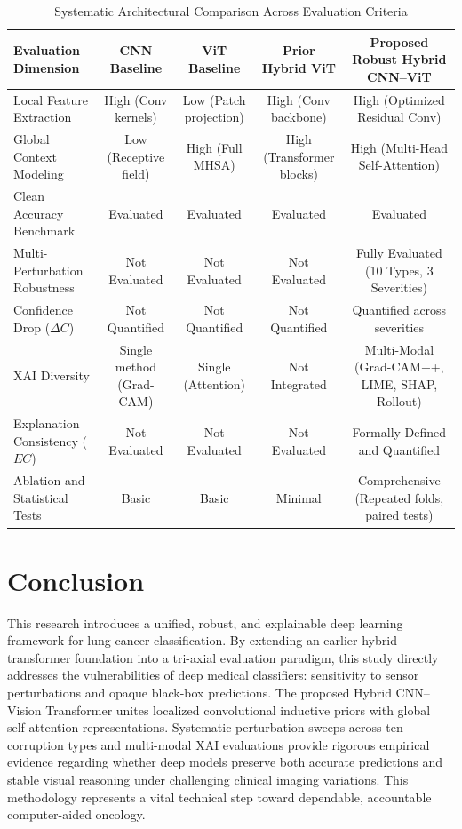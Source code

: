 \documentclass[conference]{IEEEtran}
\begin{document}
\begin{table}[t]
\caption{Systematic Architectural Comparison Across Evaluation Criteria}
\label{tab:final_comparison}
\centering
\begin{tabular}{lcccc}
\toprule
\textbf{Evaluation Dimension} & \textbf{CNN Baseline} & \textbf{ViT Baseline} & \textbf{Prior Hybrid ViT \cite{ORIGINAL_PROJECT_REF}} & \textbf{Proposed Robust Hybrid CNN--ViT} \\
\midrule
Local Feature Extraction       & High (Conv kernels)     & Low (Patch projection) & High (Conv backbone)       & High (Optimized Residual Conv) \\
Global Context Modeling        & Low (Receptive field)   & High (Full MHSA)       & High (Transformer blocks)  & High (Multi-Head Self-Attention) \\
Clean Accuracy Benchmark       & Evaluated               & Evaluated              & Evaluated                  & Evaluated \\
Multi-Perturbation Robustness  & Not Evaluated           & Not Evaluated          & Not Evaluated              & Fully Evaluated (10 Types, 3 Severities) \\
Confidence Drop ($\Delta C$)   & Not Quantified          & Not Quantified         & Not Quantified             & Quantified across severities \\
XAI Diversity                  & Single method (Grad-CAM)& Single (Attention)     & Not Integrated             & Multi-Modal (Grad-CAM++, LIME, SHAP, Rollout) \\
Explanation Consistency ($EC$) & Not Evaluated           & Not Evaluated          & Not Evaluated              & Formally Defined and Quantified \\
Ablation and Statistical Tests & Basic                   & Basic                  & Minimal                    & Comprehensive (Repeated folds, paired tests) \\
\bottomrule
\end{tabular}
\end{table}

\section{Conclusion}
\label{sec:conclusion}

This research introduces a unified, robust, and explainable deep learning framework for lung cancer classification. By extending an earlier hybrid transformer foundation into a tri-axial evaluation paradigm, this study directly addresses the vulnerabilities of deep medical classifiers: sensitivity to sensor perturbations and opaque black-box predictions. The proposed Hybrid CNN--Vision Transformer unites localized convolutional inductive priors with global self-attention representations. Systematic perturbation sweeps across ten corruption types and multi-modal XAI evaluations provide rigorous empirical evidence regarding whether deep models preserve both accurate predictions and stable visual reasoning under challenging clinical imaging variations. This methodology represents a vital technical step toward dependable, accountable computer-aided oncology.
\end{document}
